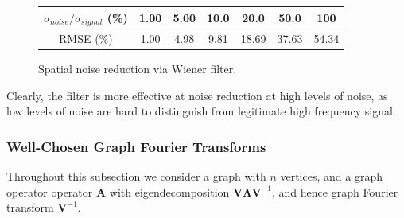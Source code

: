 \documentclass[12pt,a4paper]{article} %
\begin{document}
\begin{figure}[!ht]
    \centering
    \begin{tabular}{|c|c|c|c|c|c|c|}
        \hline
        $\sigma_{noise}/\sigma_{signal}$ (\%) & 1.00 & 5.00 & 10.0 & 20.0 & 50.0 & 100 \\
        \hline
        RMSE (\%) & 1.00 & 4.98 & 9.81 & 18.69 & 37.63 & 54.34\\
        \hline
    \end{tabular}
    \caption{Spatial noise reduction via Wiener filter.}
    \label{fig:spatial_noise}
\end{figure}

Clearly, the filter is more effective at noise reduction at high levels of noise, as low levels of noise are hard to distinguish from legitimate high frequency signal.
\subsubsection{Well-Chosen Graph Fourier Transforms}
\label{subsec:well_chosen_GFT}
Throughout this subsection we consider a graph with $n$ vertices, and a graph operator operator $\pmb{A}$ with eigendecomposition $\pmb{V\Lambda V}^{-1}$, and hence graph Fourier transform $\pmb{V}^{-1}$.\\\\
\end{document}
